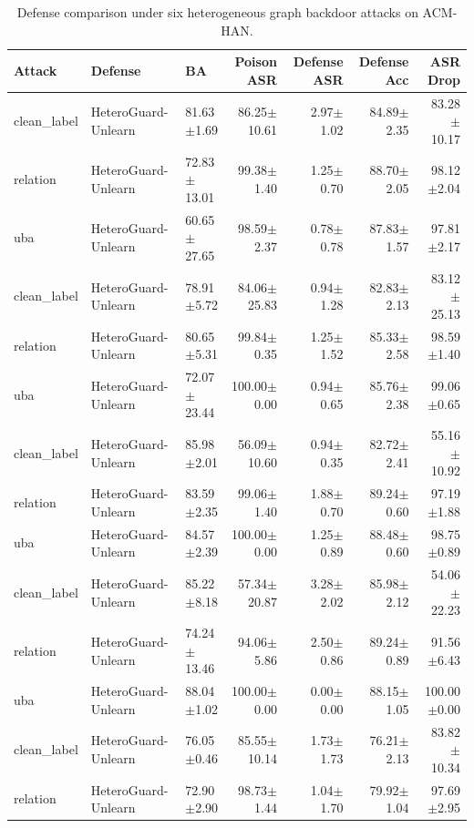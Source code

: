 \begin{table}[t]
\centering
\caption{Defense comparison under six heterogeneous graph backdoor attacks on ACM-HAN.}
\label{tab:defense_suite_acm_han}
\begin{tabular}{lllrrrr}
\toprule
Attack & Defense & BA & Poison ASR & Defense ASR & Defense Acc & ASR Drop \\
\midrule
clean_label & HeteroGuard-Unlearn & 81.63$\pm$1.69 & 86.25$\pm$10.61 & 2.97$\pm$1.02 & 84.89$\pm$2.35 & 83.28$\pm$10.17 \\
relation & HeteroGuard-Unlearn & 72.83$\pm$13.01 & 99.38$\pm$1.40 & 1.25$\pm$0.70 & 88.70$\pm$2.05 & 98.12$\pm$2.04 \\
uba & HeteroGuard-Unlearn & 60.65$\pm$27.65 & 98.59$\pm$2.37 & 0.78$\pm$0.78 & 87.83$\pm$1.57 & 97.81$\pm$2.17 \\
clean_label & HeteroGuard-Unlearn & 78.91$\pm$5.72 & 84.06$\pm$25.83 & 0.94$\pm$1.28 & 82.83$\pm$2.13 & 83.12$\pm$25.13 \\
relation & HeteroGuard-Unlearn & 80.65$\pm$5.31 & 99.84$\pm$0.35 & 1.25$\pm$1.52 & 85.33$\pm$2.58 & 98.59$\pm$1.40 \\
uba & HeteroGuard-Unlearn & 72.07$\pm$23.44 & 100.00$\pm$0.00 & 0.94$\pm$0.65 & 85.76$\pm$2.38 & 99.06$\pm$0.65 \\
clean_label & HeteroGuard-Unlearn & 85.98$\pm$2.01 & 56.09$\pm$10.60 & 0.94$\pm$0.35 & 82.72$\pm$2.41 & 55.16$\pm$10.92 \\
relation & HeteroGuard-Unlearn & 83.59$\pm$2.35 & 99.06$\pm$1.40 & 1.88$\pm$0.70 & 89.24$\pm$0.60 & 97.19$\pm$1.88 \\
uba & HeteroGuard-Unlearn & 84.57$\pm$2.39 & 100.00$\pm$0.00 & 1.25$\pm$0.89 & 88.48$\pm$0.60 & 98.75$\pm$0.89 \\
clean_label & HeteroGuard-Unlearn & 85.22$\pm$8.18 & 57.34$\pm$20.87 & 3.28$\pm$2.02 & 85.98$\pm$2.12 & 54.06$\pm$22.23 \\
relation & HeteroGuard-Unlearn & 74.24$\pm$13.46 & 94.06$\pm$5.86 & 2.50$\pm$0.86 & 89.24$\pm$0.89 & 91.56$\pm$6.43 \\
uba & HeteroGuard-Unlearn & 88.04$\pm$1.02 & 100.00$\pm$0.00 & 0.00$\pm$0.00 & 88.15$\pm$1.05 & 100.00$\pm$0.00 \\
clean_label & HeteroGuard-Unlearn & 76.05$\pm$0.46 & 85.55$\pm$10.14 & 1.73$\pm$1.73 & 76.21$\pm$2.13 & 83.82$\pm$10.34 \\
relation & HeteroGuard-Unlearn & 72.90$\pm$2.90 & 98.73$\pm$1.44 & 1.04$\pm$1.70 & 79.92$\pm$1.04 & 97.69$\pm$2.95 \\

\end{tabular}
\end{table}
